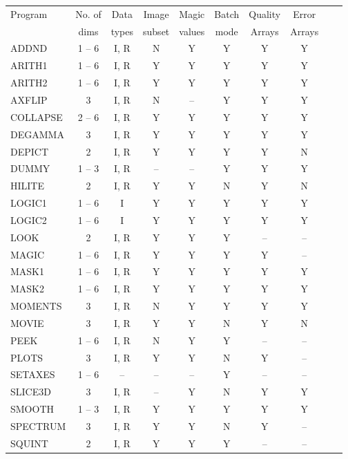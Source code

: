 {\small
\begin{table}[ht]
\begin{center}                
\begin{tabular}{|l|c|c|c|c|c|c|c|c|c|} \hline                                  
Program & No. of & Data  & Image  & Magic  & Batch & Quality & Error \\
        & dims   & types & subset & values & mode  & Arrays & Arrays\\
\hline
ADDND     & 1 -- 6 & I, R & N & Y & Y & Y & Y\\
ARITH1    & 1 -- 6 & I, R & Y & Y & Y & Y & Y\\
ARITH2    & 1 -- 6 & I, R & Y & Y & Y & Y & Y\\
AXFLIP    & 3      & I, R & N & -- & Y & Y & Y\\
COLLAPSE  & 2 -- 6 & I, R & Y & Y & Y & Y & Y\\
DEGAMMA   & 3      & I, R & Y & Y & Y & Y & Y\\
DEPICT    & 2      & I, R & Y & Y & Y & Y & N\\
DUMMY     & 1 -- 3 & I, R & -- & -- & Y & Y & Y\\
HILITE    & 2      & I, R & Y & Y & N & Y & N\\
LOGIC1    & 1 -- 6 & I    & Y & Y & Y & Y & Y\\
LOGIC2    & 1 -- 6 & I    & Y & Y & Y & Y & Y\\
LOOK      & 2      & I, R & Y & Y & Y & -- & --\\
MAGIC     & 1 -- 6 & I, R & Y & Y & Y & Y & --\\
MASK1     & 1 -- 6 & I, R & Y & Y & Y & Y & Y\\
MASK2     & 1 -- 6 & I, R & Y & Y & Y & Y & Y\\
MOMENTS   & 3      & I, R & N & Y & Y & Y & Y\\
MOVIE     & 3      & I, R & Y & Y & N & Y & N\\
PEEK      & 1 -- 6 & I, R & N & Y & Y & -- & --\\
PLOTS     & 3      & I, R & Y & Y & N & Y & --\\
SETAXES   & 1 -- 6 & --   & -- & -- & Y & -- & --\\
SLICE3D   & 3      & I, R & -- & Y & N & Y & Y\\
SMOOTH    & 1 -- 3 & I, R & Y & Y & Y & Y & Y\\
SPECTRUM  & 3      & I, R & Y & Y & N & Y & --\\
SQUINT    & 2      & I, R & Y & Y & Y & -- & --\\

\end{tabular}
\end{center}
\end{table}}
